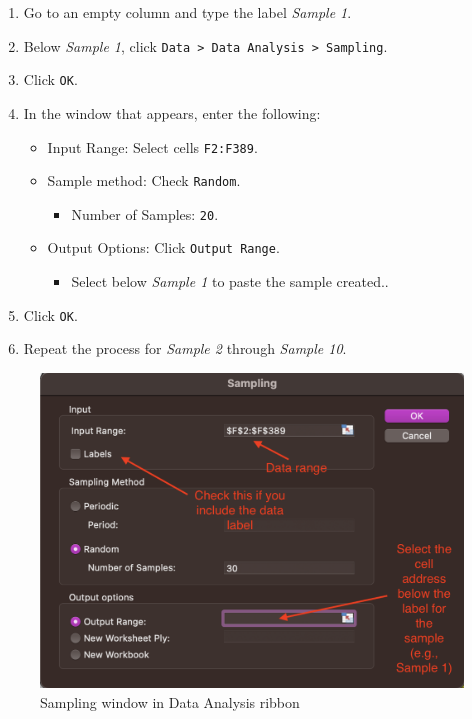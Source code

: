 \documentclass[
]{book}
\providecommand{\tightlist}{%
  \setlength{\itemsep}{0pt}\setlength{\parskip}{0pt}}
\begin{document}
\begin{enumerate}
\def\labelenumi{\arabic{enumi}.}
\tightlist
\item
  Go to an empty column and type the label \emph{Sample 1}.
\item
  Below \emph{Sample 1}, click \texttt{Data\ \textgreater{}\ Data\ Analysis\ \textgreater{}\ Sampling}.
\item
  Click \texttt{OK}.
\item
  In the window that appears, enter the following:

  \begin{itemize}
  \tightlist
  \item
    Input Range: Select cells \texttt{F2:F389}.
  \item
    Sample method: Check \texttt{Random}.

    \begin{itemize}
    \tightlist
    \item
      Number of Samples: \texttt{20}.
    \end{itemize}
  \item
    Output Options: Click \texttt{Output\ Range}.

    \begin{itemize}
    \tightlist
    \item
      Select below \emph{Sample 1} to paste the sample created..
    \end{itemize}
  \end{itemize}
\item
  Click \texttt{OK}.
\item
  Repeat the process for \emph{Sample 2} through \emph{Sample 10}.
\end{enumerate}

\begin{figure}

{\centering \includegraphics[width=0.75\linewidth]{data-analysis-sampling} 

}

\caption{Sampling window in Data Analysis ribbon}\label{fig:data-analysis-sampling}
\end{figure}
\end{document}
